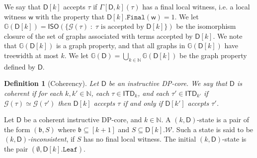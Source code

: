 \documentclass[11pt,a4paper]{article}
\newtheorem{definition}[theorem]{Definition}
\newcommand{\treewidthvalue}{k}
\newcommand{\decompositiongraph}[1]{\mathcal{G}(#1)}
\newcommand{\N}{\mathbb{N}}
\newcommand{\abag}{\mathfrak{b}}
\newcommand{\initialsetgeneric}{\mathtt{Leaf}}
\newcommand{\finalwitnessgenericcore}{\mathtt{Final}}
\newcommand{\allabstractdecompositionstreewidth}[1]{\mathsf{ITD}_{#1}}
\newcommand{\abstractdecomposition}{\tau}
\newcommand{\allwitnesses}{\mathcal{W}}
\newcommand{\awitness}{\mathsf{w}}
\newcommand{\dpcoregraphproperty}[1]{\mathbb{G}(#1)}
\newcommand{\isomorphismclosure}[1]{\mathsf{ISO}(#1)}
\newcommand{\dpcore}{\mathsf{D}}
\newcommand{\witnessset}{S}
\newcommand{\dynamizationfunctionname}[1]{\Gamma[{#1}]}
\newcommand{\dynamizationfunction}[2]{\dynamizationfunctionname{#1,#2}}
\begin{document}
We say that $\dpcore[\treewidthvalue]$ accepts $\abstractdecomposition$ if
$\dynamizationfunction{\dpcore}{\treewidthvalue}(\abstractdecomposition)$ has a final local witness,
i.e. a local witness $\awitness$ with the property that $\dpcore[\treewidthvalue].\finalwitnessgenericcore(\awitness)=1$.
We let  $\dpcoregraphproperty{\dpcore[\treewidthvalue]} = \isomorphismclosure{\{\decompositiongraph{\abstractdecomposition}\;:\;
\abstractdecomposition \mbox{ is accepted by }\dpcore[\treewidthvalue]\}}$ be the
isomorphism closure of the set of graphs associated with terms accepted by $\dpcore[\treewidthvalue]$.
We note that $\dpcoregraphproperty{\dpcore[\treewidthvalue]}$ is a graph property, and that all graphs in  $\dpcoregraphproperty{\dpcore[\treewidthvalue]}$ have treewidth at most $\treewidthvalue$.
 We let $\dpcoregraphproperty{\dpcore}=\bigcup_{\treewidthvalue\in \N} \dpcoregraphproperty{\dpcore[\treewidthvalue]}$ be the graph property defined by $\dpcore$.



\begin{definition}[Coherency]
\label{definition:CoherencyDPCore}
Let $\dpcore$ be an instructive DP-core.
We say that $\dpcore$ is coherent if for each $\treewidthvalue,\treewidthvalue'\in \N$,
each $\abstractdecomposition\in \allabstractdecompositionstreewidth{\treewidthvalue}$, and
each $\abstractdecomposition'\in \allabstractdecompositionstreewidth{\treewidthvalue'}$
if $\decompositiongraph{\abstractdecomposition} \simeq \decompositiongraph{\abstractdecomposition'}$
then $\dpcore[\treewidthvalue]$ accepts $\abstractdecomposition$ if and only if $\dpcore[\treewidthvalue']$ accepts $\abstractdecomposition'$.
\end{definition}



Let $\dpcore$ be a coherent instructive DP-core, and $\treewidthvalue\in \N$. A $(\treewidthvalue,\dpcore)$-state is a pair of the form $(\abag,\witnessset)$ where $\abag\subseteq [\treewidthvalue+1]$ and $\witnessset\subseteq \dpcore[\treewidthvalue].\allwitnesses$. Such a state is said to be {\em $(\treewidthvalue,\dpcore)$-inconsistent}, if $\witnessset$ has no final local witness. The initial $(\treewidthvalue,\dpcore)$-state is the pair $(\emptyset,\dpcore[\treewidthvalue].\initialsetgeneric)$.
\end{document}
